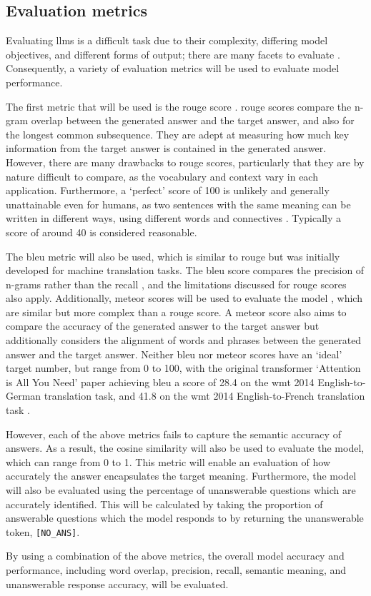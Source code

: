 \subsection{Evaluation metrics}
Evaluating \acrlong{llm}s is a difficult task due to their complexity, differing model objectives, and different forms of output; there are many facets to evaluate \citep{chang2023survey}. Consequently, a variety of evaluation metrics will be used to evaluate model performance.

The first metric that will be used is the \acrshort{rouge} score \citep{lin-2004-rouge}. \acrshort{rouge} scores compare the n-gram overlap between the generated answer and the target answer, and also for the longest common subsequence. They are adept at measuring how much key information from the target answer is contained in the generated answer. However, there are many drawbacks to \acrshort{rouge} scores, particularly that they are by nature difficult to compare, as the vocabulary and context vary in each application. Furthermore, a `perfect' score of 100 is unlikely and generally unattainable even for humans, as two sentences with the same meaning can be written in different ways, using different words and connectives \citep{schluter-2017-limits}. Typically a score of around 40 is considered reasonable.

The \acrshort{bleu} metric will also be used, which is similar to \acrshort{rouge} but was initially developed for machine translation tasks. The \acrshort{bleu} score compares the precision of n-grams rather than the recall \citep{papineniBleu}, and the limitations discussed for \acrshort{rouge} scores also apply. Additionally, \acrshort{meteor} scores will be used to evaluate the model \citep{banerjeeMeteor}, which are similar but more complex than a \acrshort{rouge} score. A \acrshort{meteor} score also aims to compare the accuracy of the generated answer to the target answer but additionally considers the alignment of words and phrases between the generated answer and the target answer. Neither \acrshort{bleu} nor \acrshort{meteor} scores have an `ideal' target number, but range from 0 to 100, with the original transformer `Attention is All You Need' paper achieving \acrshort{bleu} a score of 28.4 on the \acrshort{wmt} 2014 English-to-German translation task, and 41.8 on the \acrshort{wmt} 2014 English-to-French translation task \cite{vaswani2017attention}.

However, each of the above metrics fails to capture the semantic accuracy of answers. As a result, the cosine similarity will also be used to evaluate the model, which can range from 0 to 1. This metric will enable an evaluation of how accurately the answer encapsulates the target meaning. Furthermore, the model will also be evaluated using the percentage of unanswerable questions which are accurately identified. This will be calculated by taking the proportion of answerable questions which the model responds to by returning the unanswerable token, \texttt{[NO\_ANS]}.

By using a combination of the above metrics, the overall model accuracy and performance, including word overlap, precision, recall, semantic meaning, and unanswerable response accuracy, will be evaluated.
